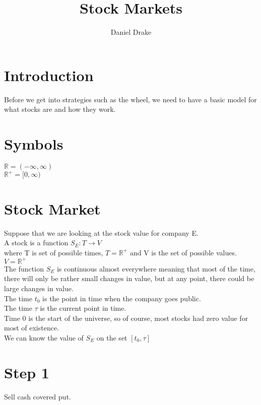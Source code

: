 \documentclass[12pt]{extarticle}
\title{Stock Markets}
\author{Daniel Drake}
\theoremstyle{plain}
\theoremstyle{Definition}
\theoremstyle{Definition}
\theoremstyle{plain}
\begin{document}
	\maketitle

	\section{Introduction}
	Before we get into strategies such as the wheel, we need to have a basic model for what stocks are and how they work. 
	
	\section{Symbols}
	$\mathbb{R} = (-\infty,\infty)$ \\ 
	$\mathbb{R}^+ = [0,\infty)$

	\section{Stock Market}
	
	Suppose that we are looking at the stock value for company E. \\
	A stock is a function $S_E : T \to V$ \\
	where T is set of possible times, $T = \mathbb{R}^+$ and V is the set of possible values. $V = \mathbb{R}^+$ \\ 

	The function $S_E$ is continuous almost everywhere meaning that most of the time, there will only be rather small changes in value, but at any point, there could be large changes in value. \\

	The time $t_0$ is the point in time when the company goes public. \\

	The time $\tau$ is the current point in time. \\
	Time 0 is the start of the universe, so of course, most stocks had zero value for most of existence. \\

	We can know the value of $S_E$ on the set $[t_0,\tau]$ \\
	
	\section{Step 1}
	Sell cash covered put. \\ \\


	
\end{document}
